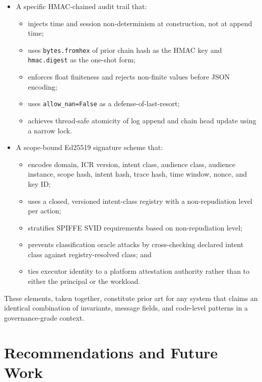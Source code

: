 \documentclass[11pt]{article}
\begin{document}
\begin{itemize}
  \item A specific HMAC-chained audit trail that:
    \begin{itemize}
      \item injects time and session non-determinism at construction,
            not at append time;
      \item uses \texttt{bytes.fromhex} of prior chain hash as the
            HMAC key and \texttt{hmac.digest} as the one-shot form;
      \item enforces float finiteness and rejects non-finite values
            before JSON encoding;
      \item uses \texttt{allow\_nan=False} as a defense-of-last-resort;
      \item achieves thread-safe atomicity of log append and chain head
            update using a narrow lock.
    \end{itemize}
  \item A scope-bound Ed25519 signature scheme that:
    \begin{itemize}
      \item encodes domain, ICR version, intent class, audience
            class, audience instance, scope hash, intent hash, trace
            hash, time window, nonce, and key ID;
      \item uses a closed, versioned intent-class registry with
            a non-repudiation level per action;
      \item stratifies SPIFFE SVID requirements based on non-repudiation
            level;
      \item prevents classification oracle attacks by cross-checking
            declared intent class against registry-resolved class; and
      \item ties executor identity to a platform attestation authority
            rather than to either the principal or the workload.
    \end{itemize}
\end{itemize}

These elements, taken together, constitute prior art for any system
that claims an identical combination of invariants, message fields,
and code-level patterns in a governance-grade context.

\section{Recommendations and Future Work}
\end{document}

